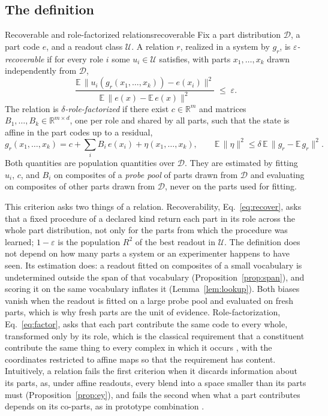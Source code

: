 \documentclass[10pt]{article}
\theoremstyle{plain}
\theoremstyle{remark}
\newcommand{\R}{\mathbb{R}}
\newcommand{\U}{\mathcal{U}}
\newcommand{\D}{\mathcal{D}}
\begin{document}
\subsection{The definition}

\begin{defbox}{Recoverable and role-factorized relations}{recoverable}
Fix a part distribution $\D$, a part code $e$, and a readout class $\U$. A relation $r$, realized in a system by $g_r$, is \emph{$\varepsilon$-recoverable} if for every role $i$ some $u_i \in \U$ satisfies, with parts $x_1, \ldots, x_k$ drawn independently from $\D$,
\begin{equation}
  \frac{\mathbb{E}\,\lVert u_i(g_r(x_1,\ldots,x_k)) - e(x_i) \rVert^2}{\mathbb{E}\,\lVert e(x) - \mathbb{E}\,e(x) \rVert^2} \;\le\; \varepsilon .
  \label{eq:recover}
\end{equation}
The relation is \emph{$\delta$-role-factorized} if there exist $c \in \R^m$ and matrices $B_1, \ldots, B_k \in \R^{m \times d}$, one per role and shared by all parts, such that the state is affine in the part codes up to a residual,
\begin{equation}
  g_r(x_1, \ldots, x_k) = c + \textstyle\sum_{i} B_i\, e(x_i) + \eta(x_1, \ldots, x_k), \qquad \mathbb{E}\,\lVert \eta \rVert^2 \le \delta\, \mathbb{E}\,\lVert g_r - \mathbb{E}\,g_r \rVert^2 .
  \label{eq:factor}
\end{equation}
Both quantities are population quantities over $\D$. They are estimated by fitting $u_i$, $c$, and $B_i$ on composites of a \emph{probe pool} of parts drawn from $\D$ and evaluating on composites of other parts drawn from $\D$, never on the parts used for fitting.
\end{defbox}

This criterion asks two things of a relation. Recoverability, Eq.~\eqref{eq:recover}, asks that a fixed procedure of a declared kind return each part in its role across the whole part distribution, not only for the parts from which the procedure was learned; $1 - \varepsilon$ is the population $R^2$ of the best readout in $\U$. The definition does not depend on how many parts a system or an experimenter happens to have seen. Its estimation does: a readout fitted on composites of a small vocabulary is undetermined outside the span of that vocabulary (Proposition~\ref{prop:span}), and scoring it on the same vocabulary inflates it (Lemma~\ref{lem:lookup}). Both biases vanish when the readout is fitted on a large probe pool and evaluated on fresh parts, which is why fresh parts are the unit of evidence. Role-factorization, Eq.~\eqref{eq:factor}, asks that each part contribute the same code to every whole, transformed only by its role, which is the classical requirement that a constituent contribute the same thing to every complex in which it occurs \citep{fodor1988}, with the coordinates restricted to affine maps so that the requirement has content. Intuitively, a relation fails the first criterion when it discards information about its parts, as, under affine readouts, every blend into a space smaller than its parts must (Proposition~\ref{prop:ey}), and fails the second when what a part contributes depends on its co-parts, as in prototype combination \citep{smith1988,hampton1987}.
\end{document}
